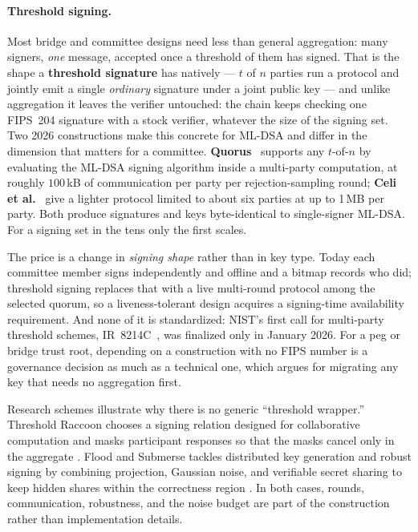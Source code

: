 \paragraph{Threshold signing.}
Most bridge and committee designs need less than general aggregation: many
signers, \emph{one} message, accepted once a threshold of them has signed. That
is the shape a \textbf{threshold signature} has natively --- $t$ of $n$ parties
run a protocol and jointly emit a single \emph{ordinary} signature under a joint
public key --- and unlike aggregation it leaves the verifier untouched: the
chain keeps checking one FIPS~204 signature with a stock verifier, whatever the
size of the signing set. Two 2026 constructions make this concrete for ML-DSA
and differ in the dimension that matters for a committee.
\textbf{Quorus}~\cite{quorus2025} supports any $t$-of-$n$ by evaluating the
ML-DSA signing algorithm inside a multi-party computation, at roughly
$100$\,kB of communication per party per rejection-sampling round;
\textbf{Celi et al.}~\cite{thresholdmldsa2026} give a lighter protocol limited to
about six parties at up to 1\,MB per party. Both produce signatures and keys
byte-identical to single-signer ML-DSA. For a signing set in the tens only the
first scales.

The price is a change in \emph{signing shape} rather than in key type. Today
each committee member signs independently and offline and a bitmap records who
did; threshold signing replaces that with a live multi-round protocol among the
selected quorum, so a liveness-tolerant design acquires a signing-time
availability requirement. And none of it is standardized: NIST's first call for
multi-party threshold schemes, IR~8214C~\cite{nistthreshold}, was finalized only
in January 2026. For a peg or bridge trust root, depending on a construction
with no FIPS number is a governance decision as much as a technical one, which
argues for migrating any key that needs no aggregation first.

Research schemes illustrate why there is no generic ``threshold wrapper.''
Threshold Raccoon chooses a signing relation designed for collaborative
computation and masks participant responses so that the masks cancel only in the
aggregate \cite{thresholdraccoon2024}. Flood and Submerse tackles distributed key
generation and robust signing by combining projection, Gaussian noise, and
verifiable secret sharing to keep hidden shares within the correctness region
\cite{floodsubmerse2024}. In both cases, rounds, communication, robustness, and the
noise budget are part of the construction rather than implementation details.

